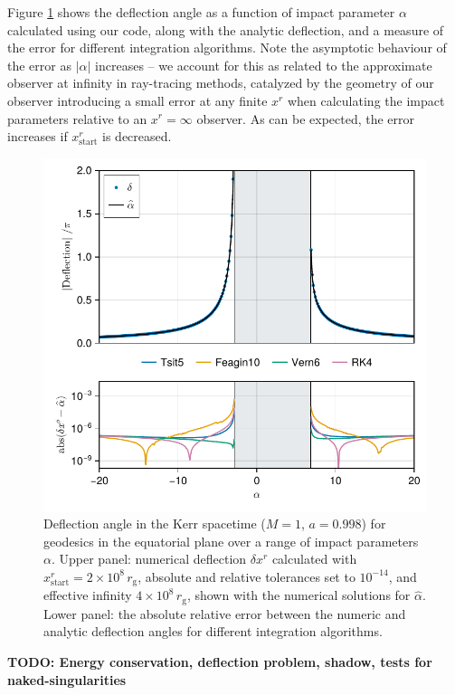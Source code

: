 \documentclass[fleqn,usenatbib]{mnras}
\newcommand{\todo}[1]{{\noindent \bf \color{red} TODO: #1}}
\newcommand{\rg}{r_\text{g}}
\begin{document}
Figure \ref{fig:deflection-angle} shows the deflection angle as a function of impact parameter $\alpha$ calculated using our code, along with the analytic deflection, and a measure of the error for different integration algorithms. Note the asymptotic behaviour of the error as $\lvert \alpha \rvert$ increases -- we account for this as related to the approximate observer at infinity in ray-tracing methods, catalyzed by the geometry of our observer introducing a small error at any finite $x^r$ when calculating the impact parameters relative to an $x^r = \infty$ observer. As can be expected, the error increases if $x^r_\text{start}$ is decreased.

\begin{figure}
	\centering
	\includegraphics[width=0.94\linewidth]{figures/deflection.iyer-hansen.pdf}
	\caption{Deflection angle in the Kerr spacetime ($M = 1$, $a = 0.998$) for geodesics in the equatorial plane over a range of impact parameters $\alpha$. Upper panel: numerical deflection $\delta x^r$ calculated with  $x^r_\text{start} = 2 \times 10^8 \, \rg$, absolute and relative tolerances set to $10^{-14}$, and effective infinity $4 \times 10^8\, \rg$, shown with the numerical solutions for $\hat{\alpha}$. Lower panel: the absolute relative error between the numeric and analytic deflection angles for different integration algorithms.}
	\label{fig:deflection-angle}
\end{figure}


\todo{Energy conservation, deflection problem, shadow, tests for naked-singularities}
\end{document}

